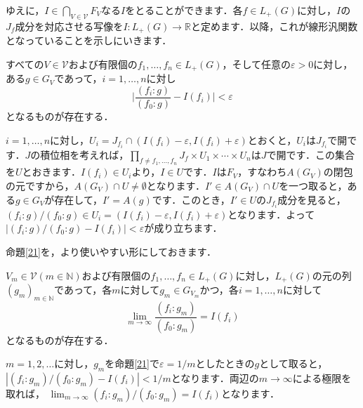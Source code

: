 ゆえに，$I \in \bigcap_{V \in \mathscr{V}}F_V$なる$I$をとることができます．各$f \in L_{+}(G)$に対し，$I$の$J_f$成分を対応させる写像を$I \colon L_{+}(G) \to \mathbb{R}$と定めます．以降，これが線形汎関数となっていることを示しにいきます．
\begin{yprop}\label{21}
すべての$V \in \mathscr{V}$および有限個の$f_1, \ldots , f_n \in L_{+}(G)$，そして任意の$\varepsilon > 0$に対し，ある$g \in G_V$であって，$i=1, \ldots , n$に対し
\[
\lvert \frac{(f_i : g )}{( f_0 : g )} -I(f_i) \lvert < \varepsilon
\]
となるものが存在する．
\end{yprop}
\begin{Proof}
$i=1, \ldots , n$に対し，$U_i=J_{f_i} \cap ( I(f_i)- \varepsilon, I(f_i)+\varepsilon )$とおくと，$U_i$は$J_{f_i}$で開です．$J$の積位相を考えれば，$\prod_{f \neq f_1, \ldots , f_n}J_f \times U_1 \times \cdots \times U_n$は$J$で開です．この集合を$U$とおきます．$I(f_i) \in U_i$より，$I \in U$です．$I$は$F_V$，すなわち$A(G_V)$の閉包の元ですから，$A(G_V) \cap U \neq \emptyset$となります．$I' \in A(G_V) \cap U$を一つ取ると，ある$g \in G_V$が存在して，$I'=A(g)$です．このとき，$I' \in U$の$J_{f_i}$成分を見ると，$(f_i : g ) / ( f_0 : g ) \in U_i = ( I(f_i)- \varepsilon, I(f_i)+\varepsilon )$となります．よって$|(f_i : g ) / ( f_0 : g ) -I(f_i) | < \varepsilon$が成り立ちます．
\end{Proof}
命題\ref{21}を，より使いやすい形にしておきます．

\begin{ycor}\label{22}
$V_m \in \mathscr{V}(m \in \mathbb{N})$および有限個の$f_1, \ldots , f_n \in L_{+}(G)$に対し，$L_{+}(G)$の元の列$(g_m)_{m \in \mathbb{N}}$であって，各$m$に対して$g_m \in G_{V_m}$かつ，各$i=1, \ldots , n$に対して 
\[
\lim_{m \to \infty} \frac{(f_i : g_m )}{( f_0 : g_m )} =I(f_i)
\]
となるものが存在する．
\end{ycor}
\begin{Proof}
$m=1,2, \ldots$に対し，$g_m$を命題\ref{21}で$\varepsilon = 1/m$としたときの$g$として取ると，$|(f_i : g_m ) / ( f_0 : g_m ) -I(f_i) | < 1/m$となります．両辺の$m \to \infty$による極限を取れば， $\lim_{m \to \infty} (f_i : g_m ) / ( f_0 : g_m ) =I(f_i)$となります．　
\end{Proof}

